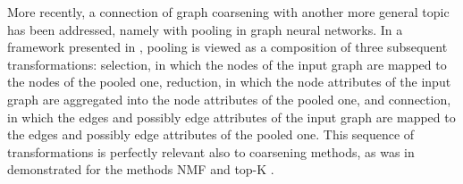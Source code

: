 More recently, a connection of graph coarsening with another more general topic has been addressed, namely with pooling in graph neural networks. In a framework presented in \cite{grattarola_understanding_2022}, pooling is viewed as a composition of three subsequent transformations: selection, in which the nodes of the input graph are mapped to the nodes of the pooled one, reduction, in which the node attributes of the input graph are aggregated into the node attributes of the pooled one, and connection, in which the edges and possibly edge attributes of the input graph are mapped to the edges and possibly edge attributes of the pooled one. This sequence of transformations is perfectly relevant also to coarsening methods, as was in \cite{grattarola_understanding_2022} demonstrated for the methods NMF \cite{bacciu_non-negative_2019} and top-K \cite{cangea_towards_2018,gao_graph_2019}.

